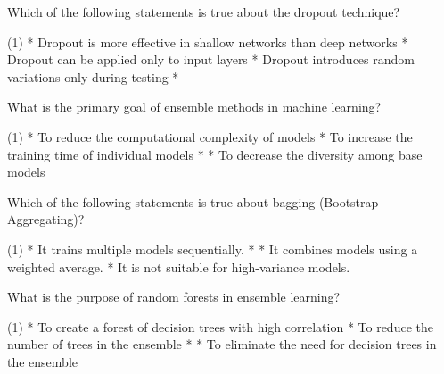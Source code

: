 \documentclass[10pt]{extarticle}
\begin{document}
\begin{exercise}
    Which of the following statements is true about the dropout technique?
    \begin{choice} (1)
        * Dropout is more effective in shallow networks than deep networks
        * Dropout can be applied only to input layers
        * Dropout introduces random variations only during testing
        * 
    \end{choice}
\end{exercise}
\begin{solution}
\end{solution}

\begin{exercise}
    What is the primary goal of ensemble methods in machine learning?
    \begin{choice}(1)
        * To reduce the computational complexity of models
        * To increase the training time of individual models
        * 
        * To decrease the diversity among base models
    \end{choice}
\end{exercise}
\begin{solution}
\end{solution}

\begin{exercise}
    Which of the following statements is true about bagging (Bootstrap Aggregating)?
    \begin{choice} (1)
        * It trains multiple models sequentially.
        * 
        * It combines models using a weighted average.
        * It is not suitable for high-variance models.
    \end{choice}
\end{exercise}
\begin{solution}
\end{solution}

\begin{exercise}
    What is the purpose of random forests in ensemble learning?
    \begin{choice}(1)
        * To create a forest of decision trees with high correlation
        * To reduce the number of trees in the ensemble
        * 
        * To eliminate the need for decision trees in the ensemble
    \end{choice}
\end{exercise}
\begin{solution}
\end{solution}
\end{document}
